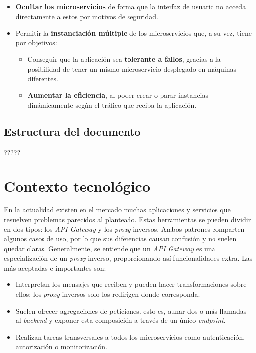 \documentclass[11pt,spanish,listoffigures]{tfgetsinf}
\begin{document}
\begin{itemize}

	\item \textbf{Ocultar los microservicios} de forma que la interfaz de usuario no acceda directamente a estos por motivos de seguridad.
	
	\item Permitir la \textbf{instanciación múltiple} de los microservicios que, a su vez, tiene por objetivos:
		\begin{itemize}
		
			\item Conseguir que la aplicación sea \textbf{tolerante a fallos}, gracias a la posibilidad de tener un mismo microservicio desplegado en máquinas diferentes.
			
			\item \textbf{Aumentar la eficiencia}, al poder crear o parar instancias dinámicamente según el tráfico que reciba la aplicación.
			
		\end{itemize}

\end{itemize}

\section{Estructura del documento}

?????


\chapter{Contexto tecnológico}

En la actualidad existen en el mercado muchas aplicaciones y servicios que resuelven problemas parecidos al planteado. Estas herramientas se pueden dividir en dos tipos: los \emph{API Gateway} y los \emph{proxy} inversos. Ambos patrones comparten algunos casos de uso, por lo que sus diferencias causan confusión y no suelen quedar claras. Generalmente, se entiende que un \emph{API Gateway} es una especialización de un \emph{proxy} inverso, proporcionando así funcionalidades extra. Las más aceptadas e importantes son:

\begin{itemize}

	\item Interpretan los mensajes que reciben y pueden hacer transformaciones sobre ellos; los \emph{proxy} inversos solo los redirigen donde corresponda.
	\item Suelen ofrecer agregaciones de peticiones, esto es, aunar dos o más llamadas al \emph{backend} y exponer esta composición a través de un único \emph{endpoint}.
	\item Realizan tareas transversales a todos los microservicios como autenticación, autorización o monitorización.

\end{itemize}
\end{document}
